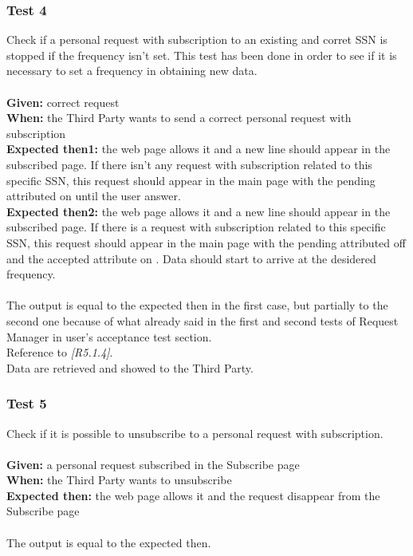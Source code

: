 \subsubsection{\Large{Test 4}}
Check if a personal request with subscription to an existing and corret SSN is stopped if the frequency isn't set. This test has been done in order to see if it is necessary to set a frequency in obtaining new data.\\
\\
\textbf{Given: } correct request  \\
\textbf{When: } the Third Party wants to send a correct personal request with subscription\\
\textbf{Expected then1: } the web page allows it and a new line should appear in the subscribed page. If there isn't any request with subscription related to this specific SSN, this request should appear in the main page with the pending attributed on until the user answer.\\
\textbf{Expected then2: } the web page allows it and a new line should appear in the subscribed page. If there is a request with subscription related to this specific SSN, this request should appear in the main page with the pending attributed off and the accepted  attribute on . Data should start to arrive at the desidered frequency.\\
\\
The output is equal to the expected then in the first case, but partially to the second one because of what already said in the first and second tests of Request Manager in user's acceptance test section.\\ 
Reference to \textit{[R5.1.4]}.\\
Data are retrieved and showed to the Third Party.

\subsubsection{\Large{Test 5}}
Check if it is possible to unsubscribe to a personal request with subscription.\\
\\
\textbf{Given: } a personal request subscribed in the Subscribe page \\
\textbf{When: } the Third Party wants to unsubscribe\\
\textbf{Expected then: } the web page allows it and the request disappear from the Subscribe page\\
\\
The output is equal to the expected then.

